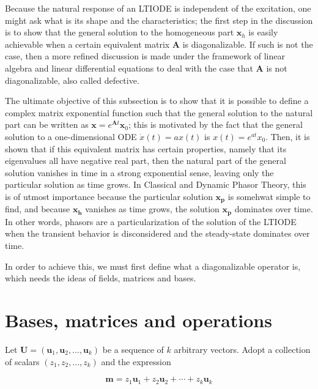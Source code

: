 	Because the natural response of an LTIODE is independent of the excitation, one might ask what is its shape and the characteristics; the first step in the discussion is to show that the general solution to the homogeneous part $\mathbf{x}_h$ is easily achievable when a certain equivalent matrix $\mathbf{A}$ is diagonalizable. If such is not the case, then a more refined discussion is made under the framework of linear algebra and linear differential equations to deal with the case that $\mathbf{A}$ is not diagonalizable, also called defective.

	The ultimate objective of this subsection is to show that it is possible to define a complex matrix exponential function such that the general solution to the natural part can be written as $\mathbf{x} = e^{\mathbf{A}t}\mathbf{x}_0$; this is motivated by the fact that the general solution to a one-dimensional ODE $\dot{x}(t) = ax(t)$ is $x(t) = e^{at}x_0$. Then, it is shown that if this equivalent matrix has certain properties, namely that its eigenvalues all have negative real part, then the natural part of the general solution vanishes in time in a strong exponential sense, leaving only the particular solution as time grows. In Classical and Dynamic Phasor Theory, this is of utmost importance because the particular solution $\mathbf{x_p}$ is somehwat simple to find, and because $\mathbf{x_h}$ vanishes as time grows, the solution $\mathbf{x_p}$ dominates over time. In other words, phasors are a particularization of the solution of the LTIODE when the transient behavior is disconsidered and the steady-state dominates over time.

	In order to achieve this, we must first define what a diagonalizable operator is, which needs the ideas of fields, matrices and bases.

\section{Bases, matrices and operations}\label{sec:bases_matrices_operations} %

	Let $\mathbf{U} = \left(\mathbf{u}_1,\mathbf{u}_2,...,\mathbf{u}_k\right)$ be a sequence of $k$ arbitrary vectors. Adopt a collection of scalars $\left(z_1,z_2,...,z_k\right)$ and the expression

\begin{equation} \mathbf{m} = z_1\mathbf{u}_1 + z_2\mathbf{u}_2 + \cdots + z_k\mathbf{u}_k \end{equation}

